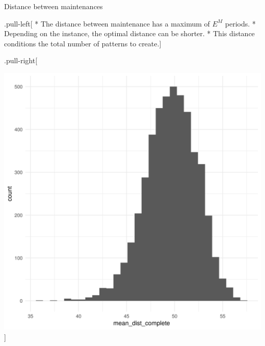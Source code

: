 \documentclass[usenames,dvipsnames]{beamer}
\begin{document}
\begin{frame}

\begin{block}{Distance between maintenances}

.pull-left{[} * The distance between maintenance has a maximum of
\(E^{M}\) periods. * Depending on the instance, the optimal distance can
be shorter. * This distance conditions the total number of patterns to
create.{]}

.pull-right{[}

\includegraphics[width=1\linewidth]{hist_mean_dist_complete_IT000125_20190716}
{]}

\end{block}

\end{frame}
\end{document}
